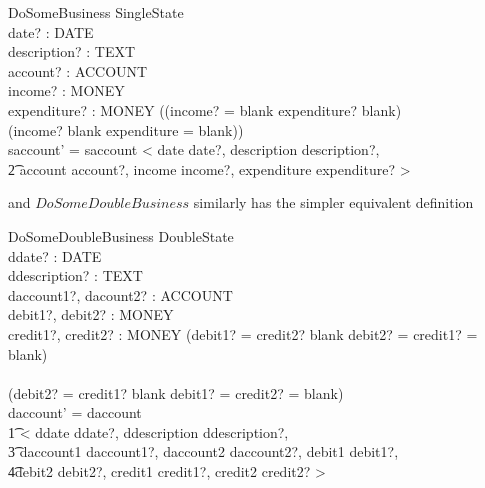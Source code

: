 \documentclass[11pt]{amsart}
\begin{document}
\begin{schema}{DoSomeBusiness}
\Delta SingleState\\
date? : DATE\\
description? : TEXT\\
account? : ACCOUNT\\ 
income? : MONEY\\
expenditure? : MONEY
\where
((income? = blank \land expenditure? \neq blank) \lor\\ (income? \neq blank \land expenditure = blank)) \land\\
saccount' = saccount \cat < \lbind date \mapsto date?, description \mapsto description?, \\
\t2 account \mapsto account?, income \mapsto income?, expenditure \mapsto expenditure?  \rbind >\\
\end{schema}

\indent and $DoSomeDoubleBusiness$ similarly has the simpler equivalent definition

\begin{schema}{DoSomeDoubleBusiness}
\Delta DoubleState\\
ddate? : DATE\\
ddescription? : TEXT\\
daccount1?, dacount2? : ACCOUNT\\ 
debit1?, debit2? : MONEY\\
credit1?, credit2? : MONEY
\where
(debit1? = credit2? \neq blank \land debit2? = credit1? = blank)\\
\lor\\
(debit2? = credit1? \neq blank \land debit1? = credit2? = blank)\\
daccount' = daccount \cat \\
\t1 < \lbind ddate \mapsto ddate?, ddescription \mapsto ddescription?, \\
\t3 daccount1 \mapsto daccount1?, daccount2 \mapsto daccount2?, debit1 \mapsto debit1?, \\
\t 4debit2 \mapsto debit2?, credit1 \mapsto credit1?, credit2 \mapsto credit2?  \rbind >\\
\end{schema}
\end{document}
